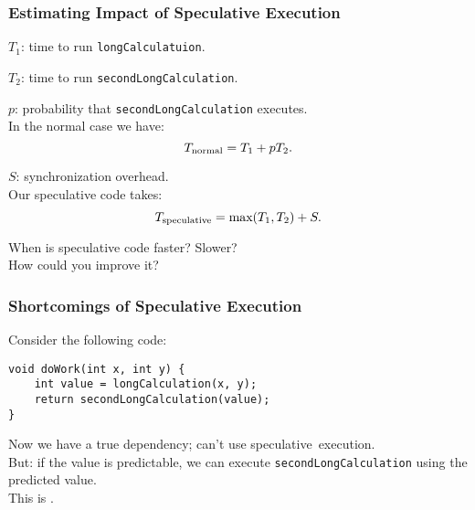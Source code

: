 \begin{frame}
  \frametitle{Estimating Impact of Speculative Execution}

  
  $T_1$: time to run {\tt longCalculatuion}.

  $T_2$: time to run {\tt secondLongCalculation}.

  $p$: probability that {\tt secondLongCalculation} executes.\\[1em]

  In the normal case we have:
    \[T_{\mbox{\scriptsize normal}} = T_1 + pT_2.\]

  $S$: synchronization overhead.\\
  Our speculative code takes:
    \[ T_{\mbox{\scriptsize speculative}} = \mbox{max}(T_1, T_2) + S.\]

     When is speculative code faster? Slower? \\ How could you improve it?

  
\end{frame}

\begin{frame}[fragile]
  \frametitle{Shortcomings of Speculative Execution}

  
  Consider the following code:
  
  \begin{lstlisting}
void doWork(int x, int y) {
    int value = longCalculation(x, y);
    return secondLongCalculation(value);
}
  \end{lstlisting}

  Now we have a true dependency; can't use speculative~execution.\\[1em]

  But: if the value is predictable, we can execute
      {\tt secondLongCalculation} using the predicted value.\\[1em]

  This is .
  
\end{frame}

